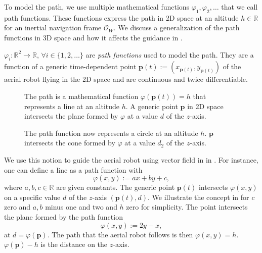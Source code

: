 To model the path, we use multiple mathematical functions $\varphi_1,\varphi_2,\dots$ that we call path functions. These functions express the path in 2D space at an altitude $h\in\mathbb{R}$ for an inertial navigation frame $\mathcal{O}_W$. We discuss a generalization of the path functions in 3D space and how it affects the guidance in . 

\begin{defn}
  \label{def:paths}
  $\varphi_i:\mathbb{R}^2\rightarrow\mathbb{R},\,\forall i\in\{1,2,\dots\}$ are \emph{path functions} used to model the path. They are a function of a generic time-dependent point $\mathbf{p}(t):=(x_{\mathbf{p}(t)},y_{\mathbf{p}(t)})$ of the aerial robot flying in the 2D space and are continuous and twice differentiable. 
\end{defn}

\begin{figure}[t!]
  \centering
  
  \caption[Concept of a line as a path function]{The path is a mathematical function $\varphi(\mathbf{p}(t))=h$ that represents a line at an altitude $h$. A generic point $\mathbf{p}$ in 2D space intersects the plane formed by $\varphi$ at a value $d$ of the $z$-axis.}
  \label{fig:line-pf}
\end{figure}

\begin{figure}[t!]
  \centering
  
  \caption[Concept of a circle as a path function]{The path function now represents a circle at an altitude $h$. $\mathbf{p}$ intersects the cone formed by $\varphi$ at a value $d_2$ of the $z$-axis.}
  \label{fig:circle-pf}
\end{figure}

We use this notion to guide the aerial robot using vector field in  in . For instance, one can define a line as a path function with
\begin{equation}\label{eq:basic-path}
  \varphi(x,y):=ax+by+c,
\end{equation}
where $a,b,c\in\mathbb{R}$ are given constants. The generic point $\mathbf{p}(t)$ intersects $\varphi(x,y)$ on a specific value $d$ of the $z$-axis $(\mathbf{p}(t),d)$. We illustrate the concept in  for $c$ zero and $a,b$ minus one and two and $h$ zero for simplicity. The point intersects the plane formed by the path function
\begin{equation}\label{eq:pathf-line}
  \varphi(x,y):=2y-x,%
\end{equation}
at $d=\varphi(\mathbf{p})$. The path that the aerial robot follows is then $\varphi(x,y)=h$. $\varphi(\mathbf{p})-h$ is the distance on the $z$-axis.

